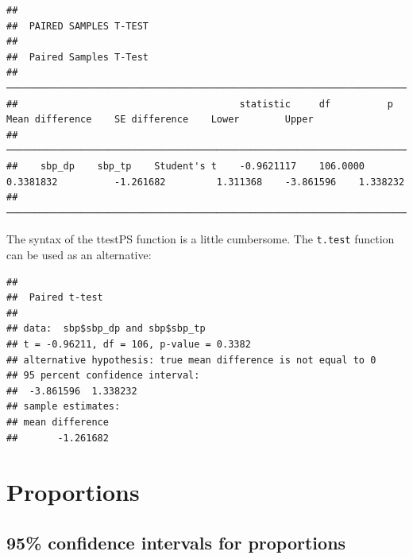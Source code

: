 \documentclass[
]{memoir}
\newenvironment{Shaded}{\begin{snugshade}}{\end{snugshade}}
\newcommand{\AttributeTok}[1]{\textcolor[rgb]{0.77,0.63,0.00}{#1}}
\newcommand{\ConstantTok}[1]{\textcolor[rgb]{0.00,0.00,0.00}{#1}}
\newcommand{\FunctionTok}[1]{\textcolor[rgb]{0.00,0.00,0.00}{#1}}
\newcommand{\NormalTok}[1]{#1}
\newcommand{\SpecialCharTok}[1]{\textcolor[rgb]{0.00,0.00,0.00}{#1}}
\begin{document}
\begin{verbatim}
## 
##  PAIRED SAMPLES T-TEST
## 
##  Paired Samples T-Test                                                                                                                   
##  ─────────────────────────────────────────────────────────────────────────────────────────────────────────────────────────────────────── 
##                                       statistic     df          p            Mean difference    SE difference    Lower        Upper      
##  ─────────────────────────────────────────────────────────────────────────────────────────────────────────────────────────────────────── 
##    sbp_dp    sbp_tp    Student's t    -0.9621117    106.0000    0.3381832          -1.261682         1.311368    -3.861596    1.338232   
##  ───────────────────────────────────────────────────────────────────────────────────────────────────────────────────────────────────────
\end{verbatim}

The syntax of the ttestPS function is a little cumbersome. The \texttt{t.test} function can be used as an alternative:

\begin{Shaded}
\end{Shaded}

\begin{verbatim}
## 
##  Paired t-test
## 
## data:  sbp$sbp_dp and sbp$sbp_tp
## t = -0.96211, df = 106, p-value = 0.3382
## alternative hypothesis: true mean difference is not equal to 0
## 95 percent confidence interval:
##  -3.861596  1.338232
## sample estimates:
## mean difference 
##       -1.261682
\end{verbatim}

\hypertarget{proportions}{%
\chapter{Proportions}\label{proportions}}

\hypertarget{confidence-intervals-for-proportions}{%
\section{95\% confidence intervals for proportions}\label{confidence-intervals-for-proportions}}
\end{document}
